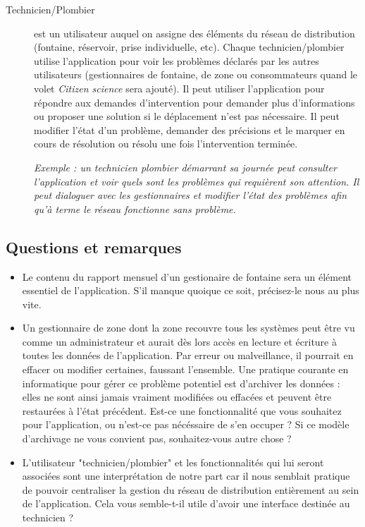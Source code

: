 \documentclass[a4paper, 11pt]{article}
\begin{document}
\begin{description}
    \item[Technicien/Plombier] est un utilisateur auquel on assigne des éléments du réseau de distribution (fontaine, réservoir, prise individuelle, etc). Chaque technicien/plombier utilise l'application pour voir les problèmes déclarés par les autres utilisateurs (gestionnaires de fontaine, de zone ou consommateurs quand le volet \emph{Citizen science} sera ajouté). Il peut utiliser l'application pour répondre aux demandes d'intervention pour demander plus d'informations ou proposer une solution si le déplacement n'est pas nécessaire. Il peut modifier l'état d'un problème, demander des précisions et le marquer en cours de résolution ou résolu une fois l'intervention terminée.

    \emph{Exemple : un technicien plombier démarrant sa journée peut consulter l'application et voir quels sont les problèmes qui requièrent son attention. Il peut dialoguer avec les gestionnaires et modifier l'état des problèmes afin qu'à terme le réseau fonctionne sans problème.}

  \end{description}
  \subsection{Questions et remarques}
  \begin{itemize}
    \item Le contenu du rapport mensuel d'un gestionaire de fontaine sera un élément essentiel de l'application. S'il manque quoique ce soit, précisez-le nous au plus vite.
    \item Un gestionnaire de zone dont la zone recouvre tous les systèmes peut être vu comme un administrateur et aurait dès lors accès en lecture et écriture à toutes les données de l'application. Par erreur ou malveillance, il pourrait en effacer ou modifier certaines, faussant l'ensemble. Une pratique courante en informatique pour gérer ce problème potentiel est d'archiver les données : elles ne sont ainsi jamais vraiment modifiées ou effacées et peuvent être restaurées à l'état précédent. Est-ce une fonctionnalité que vous souhaitez pour l'application, ou n'est-ce pas nécéssaire de s'en occuper ? Si ce modèle d'archivage ne vous convient pas, souhaitez-vous autre chose ?
    \item L'utilisateur "technicien/plombier" et les fonctionnalités qui lui seront associées sont une interprétation de notre part car il nous semblait pratique de pouvoir centraliser la gestion du réseau de distribution entièrement au sein de l'application. Cela vous semble-t-il utile d'avoir une interface destinée au technicien ?
  \end{itemize}
\end{document}
